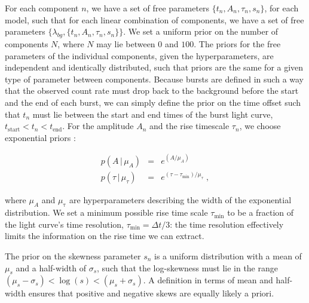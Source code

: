\documentclass[12pt]{emulateapj}
\newcommand{\given}{\,|\,}
\newcommand{\mean}{\lambda}
\begin{document}
For each component $n$, we have a set of free parameters $\{t_n, A_n, \tau_n, s_n \}$, for each model, such that for each
linear combination of components, we have a set of free parameters $\{\mean_{bg}, \{t_n, A_n, \tau_n, s_n\} \}$.
We set a uniform prior on the number of components $N$, where $N$ may lie between $0$ and $100$. 
The priors for the free parameters of the individual components, given the hyperparameters, are independent and identically distributed, such that priors 
are the same for a given type of parameter between components. 
Because bursts are defined in such a way that the observed count rate must drop back to the background before the
start and the end of each burst, we can simply define the prior on the time offset such that $t_n$ must lie between
the start and end times of the burst light curve, $t_{\mathrm{start}} < t_n < t_\mathrm{end}$. 
For the amplitude $A_n$ and the rise timescale $\tau_n$, we choose exponential priors \citep{skilling1998}:


\begin{eqnarray}
p(A \given \mu_A) &=& e^{(A/\mu_A)} \\
p(\tau \given \mu_{\tau}) & = & e^{(\tau - \tau_{\mathrm{min}})/\mu_{\tau}} \; ,
\end{eqnarray}

where $\mu_A$ and $\mu_{\mathrm{\tau}}$ are hyperparameters describing the width of the exponential distribution.
We set a minimum possible rise time scale $\tau_{\mathrm{min}}$ to be a fraction of the light curve's time resolution,
$\tau_{\mathrm{min}} = \Delta t/3$: the time resolution effectively limits the information on the rise time we can extract.

The prior on the skewness parameter $s_n$ is a uniform distribution with a mean of $\mu_s$ and a half-width of $\sigma_s$, such
that the log-skewness must lie in the range $(\mu_s-\sigma_s) < \log{(s)} < (\mu_s+\sigma_s)$. A definition in terms of mean and half-width ensures
that positive and negative skews are equally likely a priori. 


\end{document}
